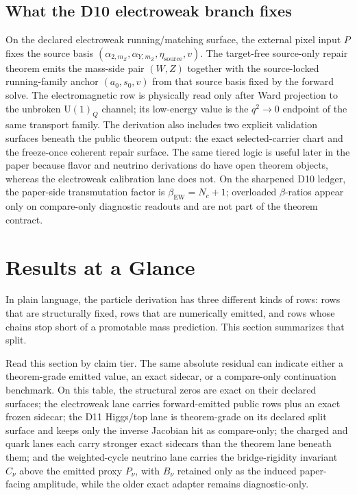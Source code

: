\documentclass[11pt]{article}
\newcommand{\U}{\mathrm{U}}
\begin{document}
\subsection{What the D10 electroweak branch fixes}

On the declared electroweak running/matching surface, the external pixel input \(P\) fixes the
source basis
\((\alpha_{2,m_Z},\alpha_{Y,m_Z},\eta_{\mathrm{source}},v)\). The target-free
source-only repair theorem emits the mass-side pair \((W,Z)\) together with the source-locked
running-family anchor \((a_0,s_0,v)\) from that source basis fixed by the forward solve. The
electromagnetic row is physically read only after Ward projection to the unbroken \(\U(1)_Q\)
channel; its low-energy value is the \(q^2\to0\) endpoint of the same transport family. The
derivation also includes two explicit validation surfaces beneath the public theorem output: the
exact selected-carrier chart and the freeze-once coherent repair surface. The same tiered logic is
useful later in the paper because flavor and neutrino derivations do have open theorem objects,
whereas the electroweak calibration lane does not.
On the sharpened D10 ledger, the paper-side transmutation factor is \(\beta_{\mathrm{EW}}=N_c+1\); overloaded \(\beta\)-ratios appear only on compare-only diagnostic readouts and are not part of the theorem contract.

\section{Results at a Glance}

In plain language, the particle derivation has three different kinds of rows: rows that are
structurally fixed, rows that are numerically emitted, and rows whose chains stop short of a promotable mass prediction. This section summarizes that split.

Read this section by claim tier. The same absolute residual can indicate either a theorem-grade emitted value, an exact sidecar, or a compare-only continuation benchmark. On this table, the structural zeros are exact on their declared surfaces; the electroweak lane carries forward-emitted public rows plus an exact frozen sidecar; the D11 Higgs/top lane is theorem-grade on its declared split surface and keeps only the inverse Jacobian hit as compare-only; the charged and quark lanes each carry stronger exact sidecars than the theorem lane beneath them; and the weighted-cycle neutrino lane carries the bridge-rigidity invariant \(C_\nu\) above the emitted proxy \(P_\nu\), with \(B_\nu\) retained only as the induced paper-facing amplitude, while the older exact adapter remains diagnostic-only.
\end{document}
